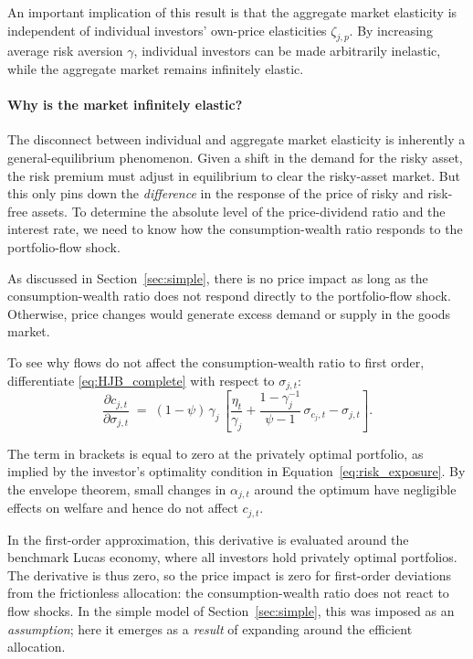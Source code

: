 \documentclass[12pt,english]{article}
\begin{document}
An important implication of this result is that the aggregate market elasticity is independent of individual investors' own-price elasticities $\zeta_{j,p}$.
By increasing average risk aversion $\gamma$, individual investors can be made arbitrarily inelastic, while the aggregate market remains infinitely elastic.


\paragraph{Why is the market infinitely elastic?}  
The disconnect between individual and aggregate market elasticity is inherently a general-equilibrium phenomenon.
Given a shift in the demand for the risky asset, the risk premium must adjust in equilibrium to clear the risky-asset market.
But this only pins down the \textit{difference} in the response of the price of risky and risk-free assets.
To determine the absolute level of the price-dividend ratio and the interest rate, we need to know how the consumption-wealth ratio responds to the portfolio-flow shock.


As discussed in Section~\ref{sec:simple}, there is no price impact as long as the consumption-wealth ratio does not respond directly to the portfolio-flow shock.
Otherwise, price changes would generate excess demand or supply in the goods market.

To see why flows do not affect the consumption-wealth ratio to first order, differentiate \eqref{eq:HJB_complete} with respect to $\sigma_{j,t}$:
\begin{equation}
    \frac{\partial c_{j,t}}{\partial \sigma_{j,t}}
    \;=\;
    (1-\psi)\,\gamma_j\,
    \left[
        \frac{\eta_t}{\gamma_j} + \frac{1-\gamma_j^{-1}}{\psi-1}\, \sigma_{c_j,t}
        - \sigma_{j,t}
    \right]\!.
\end{equation}

The term in brackets is equal to zero at the privately optimal portfolio, as implied by the investor’s optimality condition in Equation~\eqref{eq:risk_exposure}.
By the envelope theorem, small changes in $\alpha_{j,t}$ around the optimum have negligible effects on welfare and hence do not affect $c_{j,t}$.    

In the first-order approximation, this derivative is evaluated around the benchmark Lucas economy, where all investors hold privately optimal portfolios.
The derivative is thus zero, so the price impact is zero for first-order deviations from the frictionless allocation: the consumption-wealth ratio does not react to flow shocks.
In the simple model of Section~\ref{sec:simple}, this was imposed as an \emph{assumption}; here it emerges as a \emph{result} of expanding around the efficient allocation.
\end{document}
